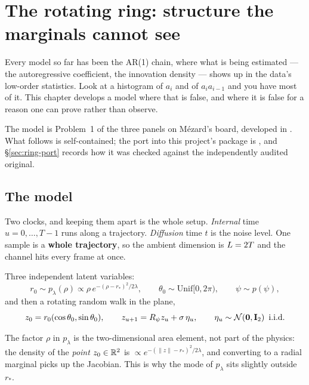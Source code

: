\chapter{The rotating ring: structure the marginals cannot see}
\label{ch:ring}

Every model so far has been the AR(1) chain, where what is being estimated --- the
autoregressive coefficient, the innovation density --- shows up in the data's low-order
statistics. Look at a histogram of $a_i$ and of $a_i a_{i-1}$ and you have most of it. This
chapter develops a model where that is false, and where it is false for a reason one can prove
rather than observe.

The model is Problem~1 of the three panels on Mézard's board, developed in
. What follows is self-contained; the port into this
project's package is , and \S\ref{sec:ring-port} records how it was
checked against the independently audited original.

\section{The model}

Two clocks, and keeping them apart is the whole setup. \emph{Internal} time
$u = 0,\dots,T-1$ runs along a trajectory. \emph{Diffusion} time $t$ is the noise level. One
sample is a \textbf{whole trajectory}, so the ambient dimension is $L = 2T$ and the
channel hits every frame at once.

Three independent latent variables:
\begin{equation}
\label{eq:ring-latents}
r_0 \sim p_\lambda(\rho) \propto \rho\,e^{-(\rho-r_*)^2/2\lambda},
\qquad
\theta_0 \sim \mathrm{Unif}[0,2\pi),
\qquad
\psi \sim p(\psi),
\end{equation}
and then a rotating random walk in the plane,
\begin{equation}
\label{eq:ring-chain}
z_0 = r_0(\cos\theta_0, \sin\theta_0),
\qquad
z_{u+1} = R_\psi z_u + \sigma\,\eta_u,
\qquad \eta_u \sim \mathcal{N}\!\left(\mathbf{0},\mathbf{I}_2\right)\ \text{i.i.d.}
\end{equation}

\begin{intuition}
The factor $\rho$ in $p_\lambda$ is the two-dimensional area element, not part of the physics:
the density of the \emph{point} $z_0\in\mathbb{R}^2$ is $\propto e^{-(\|z\|-r_*)^2/2\lambda}$, and
converting to a radial marginal picks up the Jacobian. This is why the mode of $p_\lambda$ sits
slightly outside $r_*$.
\end{intuition}

